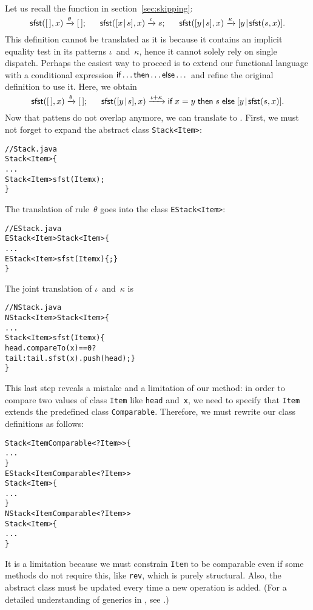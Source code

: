 Let us recall the function  in
section~\vref{sec:skipping}:
\begin{equation*}
\textsf{sfst}([\,],x)          \xrightarrow{\smash{\theta}} [\,];\quad\;\;
\textsf{sfst}([{x}\!\mid\!{s}],x)  \xrightarrow{\smash{\iota}}  s;\quad\;\;
\textsf{sfst}([{y}\!\mid\!{s}],x)  \xrightarrow{\smash{\kappa}}
                                         [{y}\!\mid\!{\textsf{sfst}(s,x)}].
\end{equation*}
This definition cannot be translated as it is because it contains an
implicit equality test in its patterns \(\iota\)~and~\(\kappa\), hence
it cannot solely rely on single dispatch. Perhaps the easiest way to
proceed is to extend our functional language with a conditional
expression \(\textsf{if} \dots \textsf{then} \dots \textsf{else} \dots\) and
refine the original definition to use it. Here, we obtain
\begin{equation*}
\textsf{sfst}([\,],x)          \xrightarrow{\smash{\theta}} [\,];\quad\;\;
\textsf{sfst}([{y}\!\mid\!{s}],x)  \xrightarrow{\smash{\iota+\kappa}}
\textsf{if} \; x = y \; \textsf{then} \; s \;
\textsf{else} \; [{y}\!\mid\!{\textsf{sfst}(s,x)}].
\end{equation*}
Now that pattens do not overlap anymore, we can translate to
\Java. First, we must not forget to expand the abstract class
\texttt{Stack<Item>}:
\begin{alltt}
// Stack.java
\public \abstractX \class Stack<Item> \{
  ...
  \public \abstractX Stack<Item> sfst(\final Item x);
\}
\end{alltt}
The translation of rule~\(\theta\) goes into the class
\texttt{EStack<Item>}:
\begin{alltt}
// EStack.java
\public \final \class EStack<Item> \extends Stack<Item> \{
  ...
  \public EStack<Item> sfst(\final Item x) \{ \return \this; \}
\}
\end{alltt}
The joint translation of \(\iota\)~and~\(\kappa\) is
\begin{alltt}
// NStack.java
\public \final \class NStack<Item> \extends Stack<Item> \{
  ...
  \public Stack<Item> sfst(\final Item x) \{
    \return head.compareTo(x) == 0 ?
           tail : tail.sfst(x).push(head); \}
\}
\end{alltt}
This last step reveals a mistake and a limitation of our method: in
order to compare two values of class \texttt{Item} like \texttt{head}
and~\texttt{x}, we need to specify that \texttt{Item} extends the
predefined class \texttt{Comparable}. Therefore, we must rewrite our
class definitions as follows:
\begin{alltt}
\public \abstractX
\class Stack<Item \extends Comparable<? \super Item>> \{
  ...
\}
\public \class EStack<Item \extends Comparable<? \super Item>>
       \extends Stack<Item> \{
  ...
\}
\public \class NStack<Item \extends Comparable<? \super Item>>
       \extends Stack<Item> \{
  ...
\}
\end{alltt}
It is a limitation because we must constrain \texttt{Item} to be
comparable even if some methods do not require this, like
\texttt{rev}, which is purely structural. Also, the abstract class
must be updated every time a new operation is added. (For a detailed
understanding of generics in \Java, see \cite{NaftalinWadler_2006}.)

